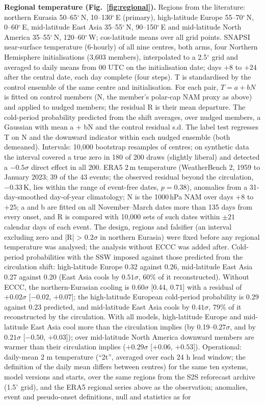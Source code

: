 \documentclass[11pt]{article}
\begin{document}
\textbf{Regional temperature (Fig.~\ref{fig:regional}).} Regions from the literature: northern Eurasia 50–65$^\circ$\,N, 10–130$^\circ$\,E (primary)\cite{kretschmer18}, high-latitude Europe 55–70$^\circ$\,N, 0–60$^\circ$\,E, mid-latitude East Asia 35–55$^\circ$\,N, 90–150$^\circ$\,E and mid-latitude North America 35–55$^\circ$\,N, 120–60$^\circ$\,W\cite{huang21}; cos-latitude means over all grid points. SNAPSI near-surface temperature (6-hourly) of all nine centres, both arms, four Northern Hemisphere initialisations (3,603 members), interpolated to a 2.5$^\circ$ grid and averaged to daily means from 00 UTC on the initialisation date; days $+8$ to $+24$ after the central date, each day complete (four steps). T is standardised by the control ensemble of the same centre and initialisation. For each pair, $T = a + bN$ is fitted on control members (N, the member's polar-cap NAM proxy as above) and applied to nudged members; the residual R is their mean departure. The cold-period probability predicted from the shift averages, over nudged members, a Gaussian with mean a + bN and the control residual s.d. The label test regresses T on N and the downward indicator within each nudged ensemble (both demeaned). Intervals: 10,000 bootstrap resamples of centres; on synthetic data the interval covered a true zero in 180 of 200 draws (slightly liberal) and detected a $-0.5\sigma$ direct effect in all 200. ERA5 2\,m temperature (WeatherBench 2, 1959 to January 2023; 39 of the 43 events; the observed residual beyond the circulation, $-0.33$\,K, lies within the range of event-free dates, $p = 0.38$), anomalies from a 31-day-smoothed day-of-year climatology; N is the 1000\,hPa NAM over days $+8$ to $+25$; a and b are fitted on all November–March dates more than 135 days from every onset, and R is compared with 10,000 sets of such dates within $\pm21$ calendar days of each event. The design, regions and falsifier (an interval excluding zero and |R| > $0.2\sigma$ in northern Eurasia) were fixed before any regional temperature was analysed; the analysis without ECCC was added after. Cold-period probabilities with the SSW imposed against those predicted from the circulation shift: high-latitude Europe 0.32 against 0.26, mid-latitude East Asia 0.27 against 0.20 (East Asia cools by $0.51\sigma$, 60\% of it reconstructed). Without ECCC, the northern-Eurasian cooling is $0.60\sigma$ [0.44, 0.71] with a residual of $+0.02\sigma$ [$-0.02$, $+0.07$]; the high-latitude European cold-period probability is 0.29 against 0.23 predicted, and mid-latitude East Asia cools by $0.41\sigma$, 79\% of it reconstructed by the circulation. With all models, high-latitude Europe and mid-latitude East Asia cool more than the circulation implies (by 0.19–$0.27\sigma$, and by $0.21\sigma$ [$-0.50$, $+0.03$]); over mid-latitude North America downward members are warmer than their circulation implies ($+0.29\sigma$ [$+0.06$, $+0.53$]). Operational: daily-mean 2 m temperature (“2t”, averaged over each 24 h lead window; the definition of the daily mean differs between centres) for the same ten systems, model versions and starts, over the same regions from the S2S reforecast archive (1.5$^\circ$ grid), and the ERA5 regional series above as the observation; anomalies, event and pseudo-onset definitions, null and statistics as for 
\end{document}
